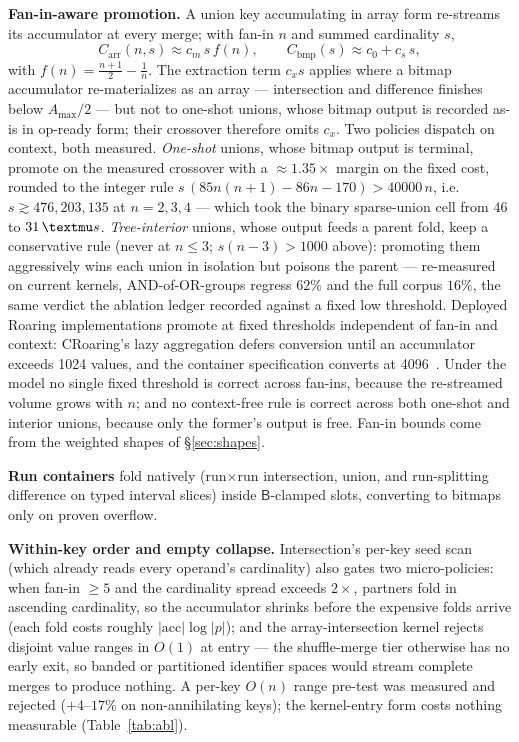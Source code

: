 \documentclass[sigconf,nonacm]{acmart}
\newcommand{\us}{\,\textmu s}
\newcommand{\B}{\ensuremath{\mathsf{B}}}
\begin{document}
\textbf{Fan-in-aware promotion.} A union key accumulating in array form
re-streams its accumulator at every merge; with fan-in $n$ and summed
cardinality $s$,
\begin{equation}
C_{\mathrm{arr}}(n,s) \approx c_m\,s\,f(n),
\qquad
C_{\mathrm{bmp}}(s) \approx c_0 + c_s\,s,
\end{equation}
with $f(n) = \tfrac{n+1}{2}-\tfrac1n$. The extraction term $c_x s$
applies where a bitmap accumulator re-materializes as an array ---
intersection and difference finishes below $A_{\max}/2$ --- but not to
one-shot unions, whose bitmap output is recorded as-is in op-ready
form; their crossover therefore omits $c_x$. Two policies dispatch on
context, both measured. \emph{One-shot} unions,
whose bitmap output is terminal, promote on the measured crossover with
a ${\approx}1.35\times$ margin on the fixed cost, rounded to the
integer rule
$s\,(85n(n{+}1) - 86n - 170) > 40000\,n$, i.e.\ $s \gtrsim 476, 203,
135$ at $n = 2, 3, 4$ --- which took the binary sparse-union cell from
$46$ to $31\us$. \emph{Tree-interior} unions, whose output feeds a
parent fold, keep a conservative rule (never at $n \le 3$;
$s(n{-}3) > 1000$ above): promoting them aggressively wins each union
in isolation but poisons the parent --- re-measured on current kernels,
AND-of-OR-groups regress $62\%$ and the full corpus $16\%$, the same
verdict the ablation ledger recorded against a fixed low threshold.
Deployed Roaring implementations promote at fixed thresholds
independent of fan-in and context: CRoaring's lazy aggregation defers
conversion until an accumulator exceeds 1024 values, and the container
specification converts at 4096~\cite{chambi2016,lemire2018}. Under the
model no single fixed threshold is correct across fan-ins, because the
re-streamed volume grows with $n$; and no context-free rule is correct
across both one-shot and interior unions, because only the former's
output is free. Fan-in bounds come from the weighted shapes of
\S\ref{sec:shapes}.

\textbf{Run containers} fold natively (run$\times$run intersection,
union, and run-splitting difference on typed interval slices) inside
$\B$-clamped slots, converting to bitmaps only on proven overflow.

\textbf{Within-key order and empty collapse.} Intersection's per-key
seed scan (which already reads every operand's cardinality) also
gates two micro-policies: when fan-in $\ge 5$ and the cardinality
spread exceeds $2\times$, partners fold in ascending cardinality, so
the accumulator shrinks before the expensive folds arrive (each fold
costs roughly $|\mathrm{acc}| \log |p|$); and the array-intersection
kernel rejects disjoint value ranges in $O(1)$ at entry --- the
shuffle-merge tier otherwise has no early exit, so banded or
partitioned identifier spaces would stream complete merges to produce
nothing. A per-key $O(n)$ range pre-test was measured and rejected
($+4$--$17\%$ on non-annihilating keys); the kernel-entry form costs
nothing measurable (Table~\ref{tab:abl}).
\end{document}
